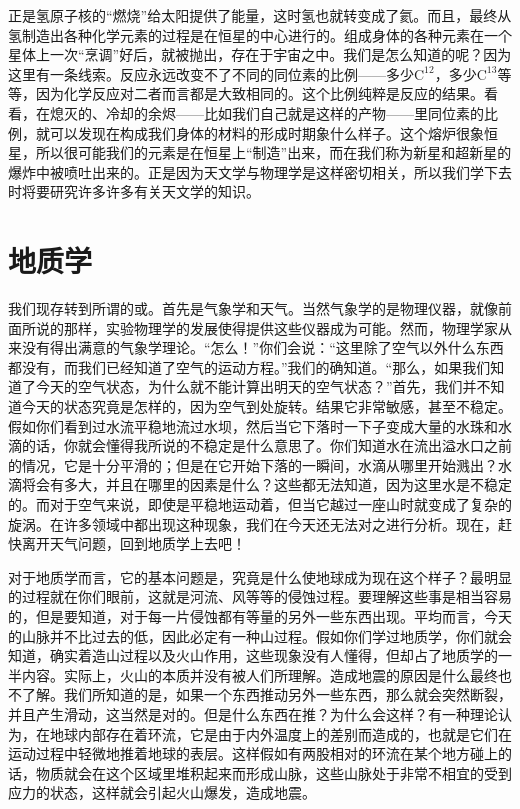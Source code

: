正是氢原子核的“燃烧”给太阳提供了能量，这时氢也就转变成了氦。而且，最终从氢制造出各种化学元素的过程是在恒星的中心进行的。组成身体的各种元素在一个星体上一次“烹调”好后，就被抛出，存在于宇宙之中。我们是怎么知道的呢？因为这里有一条线索。反应永远改变不了不同的同位素的比例——多少$\mathrm{C}^{12}$，多少$\mathrm{C}^{13}$等等，因为化学反应对二者而言都是大致相同的。这个比例纯粹是反应的结果。看看，在熄灭的、冷却的余烬——比如我们自己就是这样的产物——里同位素的比例，就可以发现在构成我们身体的材料的形成时期象什么样子。这个熔炉很象恒星，所以很可能我们的元素是在恒星上“制造”出来，而在我们称为新星和超新星的爆炸中被喷吐出来的。正是因为天文学与物理学是这样密切相关，所以我们学下去时将要研究许多许多有关天文学的知识。



\section{地质学}

我们现存转到所谓的或。首先是气象学和天气。当然气象学的是物理仪器，就像前面所说的那样，实验物理学的发展使得提供这些仪器成为可能。然而，物理学家从来没有得出满意的气象学理论。“怎么！”你们会说：“这里除了空气以外什么东西都没有，而我们已经知道了空气的运动方程。”我们的确知道。“那么，如果我们知道了今天的空气状态，为什么就不能计算出明天的空气状态？”首先，我们并不知道今天的状态究竟是怎样的，因为空气到处旋转。结果它非常敏感，甚至不稳定。假如你们看到过水流平稳地流过水坝，然后当它下落时一下子变成大量的水珠和水滴的话，你就会懂得我所说的不稳定是什么意思了。你们知道水在流出溢水口之前的情况，它是十分平滑的；但是在它开始下落的一瞬间，水滴从哪里开始溅出？水滴将会有多大，并且在哪里的因素是什么？这些都无法知道，因为这里水是不稳定的。而对于空气来说，即使是平稳地运动着，但当它越过一座山时就变成了复杂的旋涡。在许多领域中都出现这种现象，我们在今天还无法对之进行分析。现在，赶快离开天气问题，回到地质学上去吧！

对于地质学而言，它的基本问题是，究竟是什么使地球成为现在这个样子？最明显的过程就在你们眼前，这就是河流、风等等的侵蚀过程。要理解这些事是相当容易的，但是要知道，对于每一片侵蚀都有等量的另外一些东西出现。平均而言，今天的山脉并不比过去的低，因此必定有一种山过程。假如你们学过地质学，你们就会知道，确实着造山过程以及火山作用，这些现象没有人懂得，但却占了地质学的一半内容。实际上，火山的本质并没有被人们所理解。造成地震的原因是什么最终也不了解。我们所知道的是，如果一个东西推动另外一些东西，那么就会突然断裂，并且产生滑动，这当然是对的。但是什么东西在推？为什么会这样？有一种理论认为，在地球内部存在着环流，它是由于内外温度上的差别而造成的，也就是它们在运动过程中轻微地推着地球的表层。这样假如有两股相对的环流在某个地方碰上的话，物质就会在这个区域里堆积起来而形成山脉，这些山脉处于非常不相宜的受到应力的状态，这样就会引起火山爆发，造成地震。

